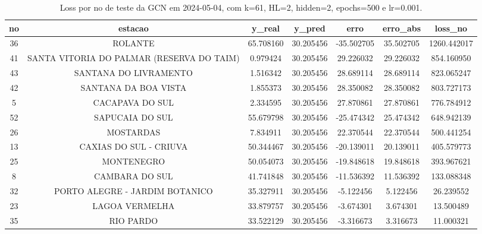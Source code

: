 \begin{table}[h]
\centering
\caption{Loss por no de teste da GCN em 2024-05-04, com k=61, HL=2, hidden=2, epochs=500 e lr=0.001.}
\label{tab:gcn_loss_k61_hl2_h2_e500_d20240504}
\begin{tabular}{ccccccc}
\toprule
no & estacao & y\_real & y\_pred & erro & erro\_abs & loss\_no \\
\midrule
36 & ROLANTE & 65.708160 & 30.205456 & -35.502705 & 35.502705 & 1260.442017 \\
41 & SANTA VITORIA DO PALMAR (RESERVA DO TAIM) & 0.979424 & 30.205456 & 29.226032 & 29.226032 & 854.160950 \\
43 & SANTANA DO LIVRAMENTO & 1.516342 & 30.205456 & 28.689114 & 28.689114 & 823.065247 \\
42 & SANTANA DA BOA VISTA & 1.855373 & 30.205456 & 28.350082 & 28.350082 & 803.727173 \\
5 & CACAPAVA DO SUL & 2.334595 & 30.205456 & 27.870861 & 27.870861 & 776.784912 \\
52 & SAPUCAIA DO SUL & 55.679798 & 30.205456 & -25.474342 & 25.474342 & 648.942139 \\
26 & MOSTARDAS & 7.834911 & 30.205456 & 22.370544 & 22.370544 & 500.441254 \\
13 & CAXIAS DO SUL - CRIUVA & 50.344467 & 30.205456 & -20.139011 & 20.139011 & 405.579773 \\
25 & MONTENEGRO & 50.054073 & 30.205456 & -19.848618 & 19.848618 & 393.967621 \\
8 & CAMBARA DO SUL & 41.741848 & 30.205456 & -11.536392 & 11.536392 & 133.088348 \\
32 & PORTO ALEGRE - JARDIM BOTANICO & 35.327911 & 30.205456 & -5.122456 & 5.122456 & 26.239552 \\
23 & LAGOA VERMELHA & 33.879757 & 30.205456 & -3.674301 & 3.674301 & 13.500489 \\
35 & RIO PARDO & 33.522129 & 30.205456 & -3.316673 & 3.316673 & 11.000321 \\
\bottomrule
\end{tabular}
\end{table}
